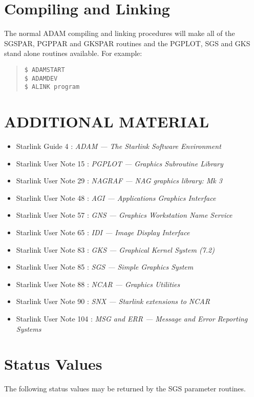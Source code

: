 \section{Compiling and Linking}

The normal ADAM compiling and linking procedures will make all of the SGSPAR,
PGPPAR and GKSPAR routines and the PGPLOT, SGS and GKS stand alone routines 
available.
For example:
\begin{quote}
\begin{verbatim}
$ ADAMSTART
$ ADAMDEV
$ ALINK program
\end{verbatim}
\end{quote}

\section{ADDITIONAL MATERIAL}
\begin{itemize}
\item Starlink Guide 4 : {\it ADAM --- The Starlink Software Environment}
\item Starlink User Note 15 : {\it PGPLOT --- Graphics Subroutine Library}
\item Starlink User Note 29 : {\it NAGRAF --- NAG graphics library: Mk 3}
\item Starlink User Note 48 : {\it AGI --- Applications Graphics Interface}
\item Starlink User Note 57 : {\it GNS --- Graphics Workstation Name Service}
\item Starlink User Note 65 : {\it IDI --- Image Display Interface}
\item Starlink User Note 83 : {\it GKS --- Graphical Kernel System (7.2)}
\item Starlink User Note 85 : {\it SGS --- Simple Graphics System}
\item Starlink User Note 88 : {\it NCAR --- Graphics Utilities}
\item Starlink User Note 90 : {\it SNX --- Starlink extensions to NCAR}
\item Starlink User Note 104 : {\it MSG and ERR --- Message and Error Reporting
Systems}
\end{itemize}

\section{Status Values}
\label{errs}
The following status values may be returned by the SGS parameter
routines.

